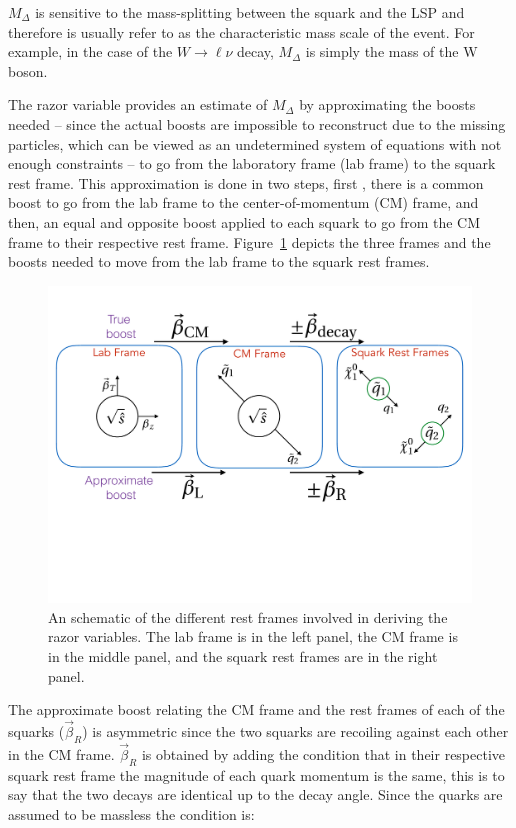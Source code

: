 $M_{\Delta}$ is sensitive to the mass-splitting between the squark and
the LSP  and therefore is usually refer to as the characteristic mass
scale of the event. For example, in the case of the $W\rightarrow
\ell\nu$ decay, $M_{\Delta}$ is simply the mass of the W boson.

The razor variable \MR provides an estimate of $M_{\Delta}$ by
approximating the boosts needed -- since the actual boosts are
impossible to reconstruct due to the missing particles, which can be
viewed as an undetermined system of equations with not enough
constraints -- to go from the laboratory frame (lab frame) to the
squark rest frame. This approximation is done in two steps, first
, there is a common boost to go from the lab frame to the
center-of-momentum (CM) frame, and then, an equal and opposite boost
applied to each squark to go from the CM frame to their respective
rest frame. Figure~\ref{fig:restFrames} depicts the three frames and
the boosts needed to move from the lab frame to the squark rest frames.
\begin{figure}
 \centering
\includegraphics[width=1.0\textwidth]{RazorVariables/RazorFrameDiagram.pdf}
 \caption{An schematic of the  different rest frames involved in
   deriving the razor variables. The lab frame is in the left panel,
   the CM frame is in the middle panel, and the  squark rest frames
   are in the right panel.\label{fig:restFrames}}
\end{figure}  

The approximate boost relating the CM frame and the rest frames of each of the
squarks ($\vec{\beta}_{R}$) is asymmetric since the two squarks are recoiling against each
other in the CM frame. $\vec{\beta}_{R}$ is obtained by adding the condition
that in their respective squark rest frame the magnitude of each quark
momentum is the same, this is to say that the two decays are identical
up to the decay angle. Since the quarks are assumed to be massless
the condition is:


